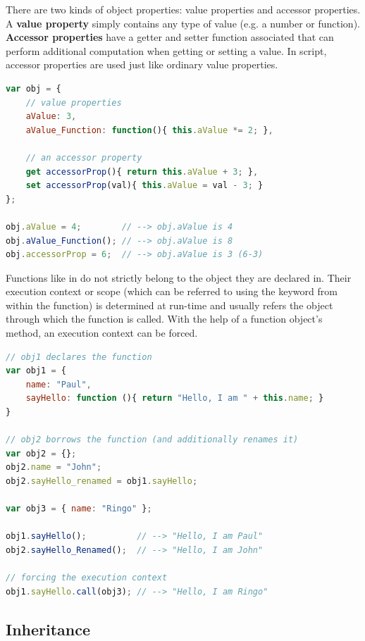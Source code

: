 There are two kinds of object properties: value properties and accessor properties. A \textbf{value property} simply contains any type of value (e.g. a number or function). \textbf{Accessor properties} have a getter and setter function associated that can perform additional computation when getting or setting a value. In script, accessor properties are used just like ordinary value properties.

\SingleSpacing
\begin{lstlisting}[language=JavaScript, caption=Properties in \myProperName{JavaScript}, label=JSProperties]
var obj = {
	// value properties
	aValue: 3,
	aValue_Function: function(){ this.aValue *= 2; },
	
	// an accessor property
	get accessorProp(){ return this.aValue + 3; },
	set accessorProp(val){ this.aValue = val - 3; }
};

obj.aValue = 4;        // --> obj.aValue is 4
obj.aValue_Function(); // --> obj.aValue is 8
obj.accessorProp = 6;  // --> obj.aValue is 3 (6-3)
\end{lstlisting}
\OnehalfSpacing

Functions like  in  do not strictly belong to the object they are declared in. Their execution context or scope (which can be referred to using the  keyword from within the function) is determined at run-time and usually refers the object through which the function is called. With the help of a function object's  method, an execution context can be forced.

\SingleSpacing
\begin{lstlisting}[language=JavaScript, caption=Execution context of functions]
// obj1 declares the function
var obj1 = {
	name: "Paul",
	sayHello: function (){ return "Hello, I am " + this.name; }
}

// obj2 borrows the function (and additionally renames it)
var obj2 = {};
obj2.name = "John";
obj2.sayHello_renamed = obj1.sayHello; 

var obj3 = { name: "Ringo" };

obj1.sayHello();          // --> "Hello, I am Paul"
obj2.sayHello_Renamed();  // --> "Hello, I am John"

// forcing the execution context
obj1.sayHello.call(obj3); // --> "Hello, I am Ringo"

\end{lstlisting}
\OnehalfSpacing

\subsection{Inheritance}
\label{sec:JSInheritance}

